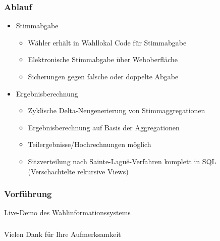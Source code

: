 \documentclass{beamer}
\begin{document}
\begin{frame}
\frametitle{Ablauf}
\begin{itemize}
\item Stimmabgabe
	\begin{itemize}
	\item Wähler erhält in Wahllokal Code für Stimmabgabe
	\item Elektronische Stimmabgabe über Weboberfläche
	\item Sicherungen gegen falsche oder doppelte Abgabe 
	\end{itemize}
\item Ergebnisberechnung
	\begin{itemize}
	\item Zyklische Delta-Neugenerierung von Stimmaggregationen
	\item Ergebnisberechnung auf Basis der Aggregationen
	\item Teilergebnisse/Hochrechnungen möglich
	\item Sitzverteilung nach Sainte-Laguë-Verfahren komplett in SQL (Verschachtelte rekursive Views)
	\end{itemize}
\end{itemize}
\end{frame}


\begin{frame}
\frametitle{Vorführung}
\begin{center}
Live-Demo des Wahlinformationssystems
\end{center}
\end{frame}

\begin{frame}
\frametitle{}
\begin{center}
Vielen Dank für Ihre Aufmerksamkeit
\end{center}
\end{frame}


\end{document}
